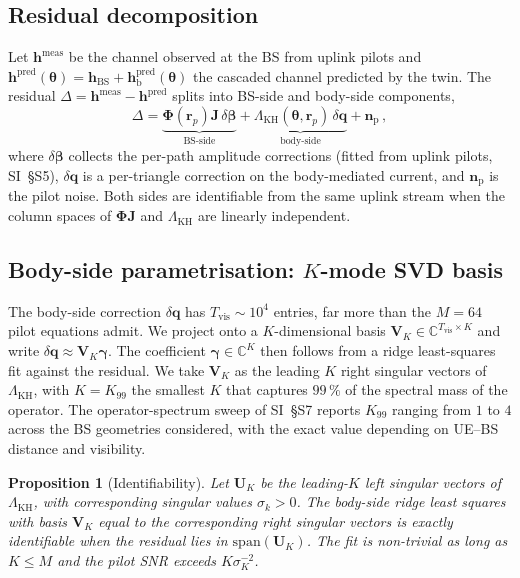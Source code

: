 \documentclass[journal,twocolumn,10pt]{IEEEtran}
\theoremstyle{plain}
\newtheorem{proposition}[theorem]{Proposition}
\theoremstyle{definition}
\theoremstyle{remark}
\newcommand{\rr}{\mathbf{r}}
\newcommand{\hh}{\bm{h}}
\newcommand{\Jmat}{\mathbf{J}}
\newcommand{\Phimat}{\mathbf{\Phi}}
\newcommand{\thetab}{\bm{\theta}}
\newcommand{\betab}{\bm{\beta}}
\newcommand{\gammab}{\bm{\gamma}}
\newcommand{\hBS}{\bm{h}_{\mathrm{BS}}}
\newcommand{\hbody}{\bm{h}_{\mathrm{b}}}
\newcommand{\Complex}{\mathbb{C}}
\begin{document}
\subsection{Residual decomposition}

Let $\hh^{\mathrm{meas}}$ be the channel observed at the BS from
uplink pilots and $\hh^{\mathrm{pred}}(\thetab) =
\hBS + \hbody^{\mathrm{pred}}(\thetab)$ the cascaded channel
predicted by the twin. The residual $\Delta = \hh^{\mathrm{meas}} -
\hh^{\mathrm{pred}}$ splits into BS-side and body-side components,
\begin{equation}\label{eq:residual}
\Delta = \underbrace{\Phimat(\rr_p)\Jmat\,\delta\betab}_{\text{BS-side}}
+ \underbrace{\Lambda_{\mathrm{KH}}(\thetab,\rr_p)\,\delta\bm{q}}_{\text{body-side}}
+ \bm{n}_{\mathrm{p}}\,,
\end{equation}
where $\delta\betab$ collects the per-path amplitude corrections
(fitted from uplink pilots, SI~\S{}S5), $\delta\bm{q}$ is a
per-triangle correction on the body-mediated current, and
$\bm{n}_{\mathrm{p}}$ is the pilot noise. Both sides are
identifiable from the same uplink stream when the column spaces of
$\Phimat\Jmat$ and $\Lambda_{\mathrm{KH}}$ are linearly independent.

\subsection{Body-side parametrisation: $K$-mode SVD basis}

The body-side correction $\delta\bm{q}$ has $T_{\mathrm{vis}} \sim
10^{4}$ entries, far more than the $M = 64$ pilot equations admit.
We project onto a $K$-dimensional basis $\bm{V}_K \in
\Complex^{T_{\mathrm{vis}}\times K}$ and write $\delta\bm{q}
\approx \bm{V}_K \gammab$. The coefficient $\gammab \in
\Complex^{K}$ then follows from a ridge least-squares fit against
the residual. We take $\bm{V}_K$ as the leading $K$ right singular
vectors of $\Lambda_{\mathrm{KH}}$, with $K = K_{99}$ the smallest
$K$ that captures $99\,\%$ of the spectral mass of the operator.
The operator-spectrum sweep of SI~\S{}S7 reports $K_{99}$ ranging
from $1$ to $4$ across the BS geometries considered, with the
exact value depending on UE--BS distance and visibility.

\begin{proposition}[Identifiability]\label{prop:ident}
Let $\bm{U}_K$ be the leading-$K$ left singular vectors of
$\Lambda_{\mathrm{KH}}$, with corresponding singular values $\sigma_k
> 0$. The body-side ridge least squares with basis $\bm{V}_K$ equal
to the corresponding right singular vectors is exactly
identifiable when the residual lies in $\mathrm{span}(\bm{U}_K)$.
The fit is non-trivial as long as $K \leq M$ and the pilot SNR
exceeds $K \sigma_K^{-2}$.
\end{proposition}
\end{document}
